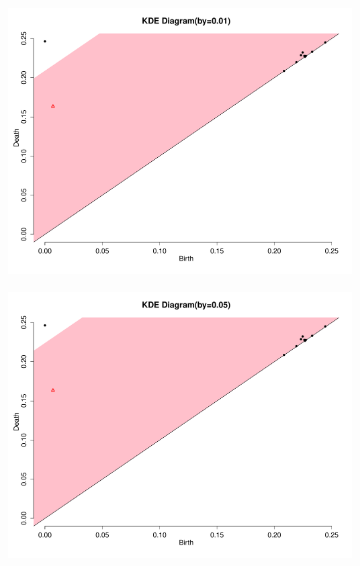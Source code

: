 \documentclass[a4paper]{article}
\begin{document}
\begin{figure}[htb!]
\centering
\begin{subfigure}{.32\textwidth}
  \centering
  \includegraphics[width=\linewidth]{KDE-by0_01}
\end{subfigure}%
\begin{subfigure}{.32\textwidth}
  \centering
  \includegraphics[width=\linewidth]{KDE-by0_05}
\end{subfigure}
\begin{subfigure}{.32\textwidth}
  \centering

\end{subfigure}
\end{figure}
\end{document}
